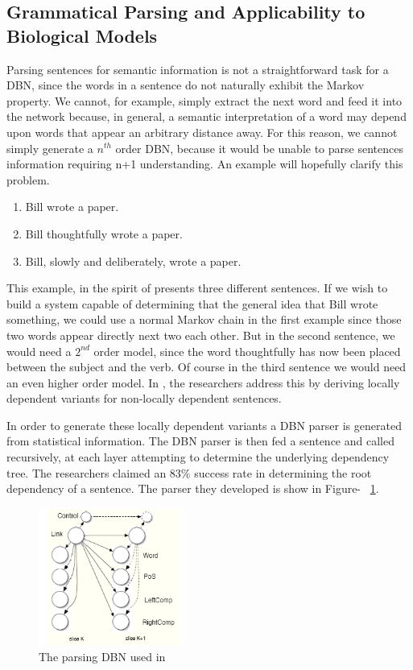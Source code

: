 \documentclass{article}
\begin{document}
\subsection{Grammatical Parsing and Applicability to Biological Models}
Parsing sentences for semantic information is not a straightforward task for a DBN, since the words in a sentence do not naturally exhibit the Markov property. We cannot, for example, simply extract the next word and feed it into the network because, in general, a semantic interpretation of a word may depend upon words that appear an arbitrary distance away. For this reason, we cannot simply generate a $n^{th}$ order DBN, because it would be unable to parse sentences information requiring n+1 understanding. An example will hopefully clarify this problem. 
\begin{enumerate}
\item
Bill wrote a paper.  
\item 
Bill thoughtfully wrote a paper.
\item 
Bill, slowly and deliberately, wrote a paper. 
\end{enumerate}

This example, in the spirit of \cite{savova2007} presents three different sentences. If we wish to build a system capable of determining that the general idea that Bill wrote something, we could use a normal Markov chain in the first example since those two words appear directly next two each other. But in the second sentence, we would need a $2^{nd}$ order model, since the word thoughtfully has now been placed between the subject and the verb. Of course in the third sentence we would need an even higher order model. In \cite{savova2007}, the researchers address this by deriving locally dependent variants for non-locally dependent sentences. 

In order to generate these locally dependent variants a DBN parser is generated from statistical information. The DBN parser is then fed a sentence and called recursively, at each layer attempting to determine the underlying dependency tree. The researchers claimed an 83\% success rate in determining the root dependency of a sentence. The parser they developed is show in Figure- ~\ref{fig:parsing}.

\begin{figure}[here]
\begin{center}
\includegraphics[height=45mm]{figures/parsing.png}
\caption{The parsing DBN used in \cite{savova2007}}
\label{fig:parsing}
\end{center}
\end{figure}
\end{document}
